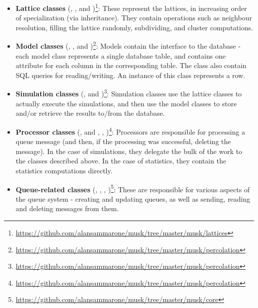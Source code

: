 \begin{itemize}
    \raggedright\item \textbf{Lattice classes} (, ,  and )\footnote{\url{https://github.com/alansammarone/musk/tree/master/musk/lattices}}: These represent the lattices, in increasing order of specialization (via inheritance). They contain operations such as neighbour resolution, filling the lattice randomly, subdividing, and cluster computations.
    
    \raggedright\item \textbf{Model classes} (, ,  and )\footnote{\url{https://github.com/alansammarone/musk/tree/master/musk/percolation}}: Models contain the interface to the database - each model class represents a single database table, and contains one attribute for each column in the corresponding table. The class also contain SQL queries for reading/writing. An instance of this class represents a row.
    
    \raggedright\item \textbf{Simulation classes} (,  and )\footnote{\url{https://github.com/alansammarone/musk/tree/master/musk/percolation}}: Simulation classes use the lattice classes to actually execute the simulations, and then use the model classes to store and/or retrieve the results to/from the database.
    
    
    \raggedright\item \textbf{Processor classes} (,  and , , )\footnote{\url{https://github.com/alansammarone/musk/tree/master/musk/percolation}}: Processors are responsible for processing a queue message (and then, if the processing was successful, deleting the message). In the case of simulations, they delegate the bulk of the work to the  classes described above. In the case of statistics, they contain the statistics computations directly.
    
    \raggedright\item \textbf{Queue-related classes} (, , ,  )\footnote{\url{https://github.com/alansammarone/musk/tree/master/musk/core}}: These are responsible for various aspects of the queue system - creating and updating queues, as well as sending, reading and deleting messages from them.
    

\end{itemize}

